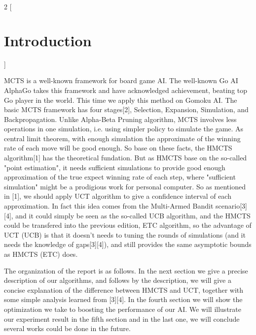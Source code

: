 \documentclass[a4paper, 11pt]{article} %
\begin{document}
	\begin{multicols}{2}
		[
		\section{Introduction}
		]
		
		MCTS is a well-known framework for board game AI. The well-known Go AI AlphaGo takes this framework and have acknowledged achievement, beating top Go player in the world. This time we apply this method on Gomoku AI. The basic MCTS framework has four stages[2], Selection, Expansion, Simulation, and Backpropagation. Unlike Alpha-Beta Pruning algorithm, MCTS involves less operations in one simulation, i.e. using simpler policy to simulate the game. As central limit theorem, with enough simulation the approximate of the winning rate of each move will be good enough. So base on these facts, the HMCTS algorithm[1] has the theoretical fundation. But as HMCTS base on the so-called "point estimation", it needs sufficient simulations to provide good enough approximation of the true expect winning rate of each step, where "sufficient simulation" might be a prodigious work for personal computer. So as mentioned in [1], we should apply UCT algorithm to give a confidence interval of each approximation. In fact this idea comes from the Multi-Armed Bandit scenario[3][4], and it could simply be seen as the so-called UCB algorithm, and the HMCTS could be transfered into the previous edition, ETC algorithm, so the advantage of UCT (UCB) is that it doesn't needs to tuning the rounds of simulations (and it needs the knowledge of gaps[3][4]), and still provides the same asymptotic bounds as HMCTS (ETC) does.
		
		The organization of the report is as follows. In the next section we give a precise description of our algorithms, and follows by the description, we will give a concise explanation of the difference between HMCTS and UCT, together with some simple analysis learned from [3][4]. In the fourth section we will show the optimization we take to boosting the performance of our AI. We will illustrate our experiment result in the fifth section and in the last one, we will conclude several works could be done in the future.
		
	\end{multicols}
	
\end{document}
